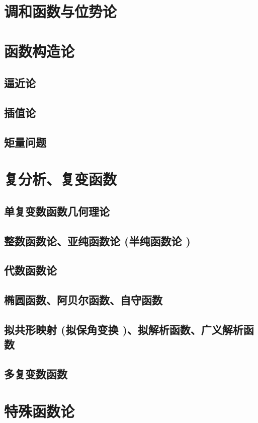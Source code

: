 \documentclass[UTF8]{../../09-Mathematics}
\begin{document}
\chapter{调和函数与位势论}


\chapter{函数构造论}
    \section{逼近论}
    \section{插值论}
    \section{矩量问题}



\chapter{复分析、复变函数}
    \section{单复变数函数几何理论}
    \section{整数函数论、亚纯函数论 (半纯函数论 )}
    \section{代数函数论}
    \section{椭圆函数、阿贝尔函数、自守函数}
    \section{拟共形映射 (拟保角变换 )、拟解析函数、广义解析函数}
    \section{多复变数函数}


    
\chapter{特殊函数论}
\end{document}
